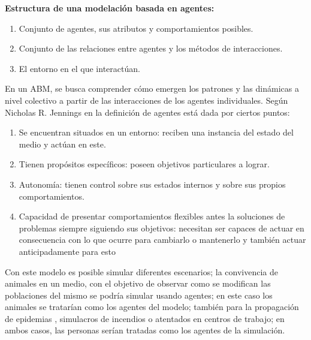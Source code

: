 \textbf{Estructura de una modelación basada en agentes:}\\
\begin{enumerate}
    \item Conjunto de agentes, sus atributos y comportamientos posibles.
    \item Conjunto de las relaciones entre agentes y los métodos de interacciones.
    \item El entorno en el que interactúan.
\end{enumerate}


En un ABM, se busca comprender cómo emergen los patrones y las dinámicas a nivel colectivo a partir de las interacciones 
de los agentes individuales. Según Nicholas R. Jennings en \autocite{Jennings2000} la definición de agentes está dada 
por ciertos puntos:\\
\begin{enumerate}
    \item Se encuentran situados en un entorno: reciben una instancia del estado del medio y actúan en este.
    \item Tienen propósitos específicos: poseen objetivos particulares a lograr.
    \item Autonomía: tienen control sobre sus estados internos y sobre sus propios comportamientos.
    \item Capacidad de presentar comportamientos flexibles antes la soluciones de problemas siempre siguiendo sus objetivos: necesitan ser capaces de actuar en consecuencia con lo que ocurre para cambiarlo o mantenerlo y también actuar anticipadamente para esto
\end{enumerate}

Con este modelo es posible simular diferentes escenarios; la convivencia de animales en un medio, con el 
objetivo de observar como se modifican las poblaciones del mismo se podría simular usando agentes; en este 
caso los animales se tratarían como los agentes del modelo; también para la propagación de epidemias \autocite{Bagni2002}, 
simulacros de incendios o atentados en centros de trabajo; en ambos casos, las personas serían tratadas como los agentes 
de la simulación.

